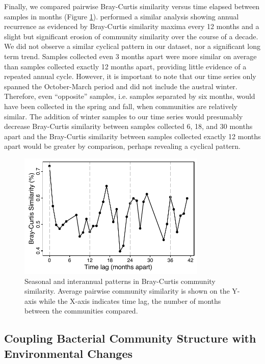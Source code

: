 Finally, we compared pairwise Bray-Curtis similarity versus time elapsed between samples in months (Figure \ref{fig:ch4:bray_curtis}). \citet{chow2013temporal} performed a similar analysis showing annual recurrence as evidenced by Bray-Curtis similarity maxima every 12 months and a slight but significant erosion of community similarity over the course of a decade. We did not observe a similar cyclical pattern in our dataset, nor a significant long term trend. Samples collected even 3 months apart were more similar on average than samples collected exactly 12 months apart, providing little evidence of a repeated annual cycle. However, it is important to note that our time series only spanned the October-March period and did not include the austral winter. Therefore, even ``opposite'' samples, i.e. samples separated by six months, would have been collected in the spring and fall, when communities are relatively similar. The addition of winter samples to our time series would presumably decrease Bray-Curtis similarity between samples collected 6, 18, and 30 months apart and the Bray-Curtis similarity between samples collected exactly 12 months apart would be greater by comparison, perhaps revealing a cyclical pattern. 

\begin{figure}[htbp] 
\centering 
\includegraphics[width=0.8\textwidth]{Chapter_5_LTER/Figures/Figure_9_bray_curtis_over_time}
\caption[Mean pairwise Bray-Curtis community similarity over elapsed time.]{Seasonal and interannual patterns in Bray-Curtis community similarity. Average pairwise community similarity is shown on the Y-axis while the X-axis indicates time lag, the number of months between the communities compared.} 
\label{fig:ch4:bray_curtis} 
\end{figure}

\subsection{Coupling Bacterial Community Structure with Environmental Changes}

